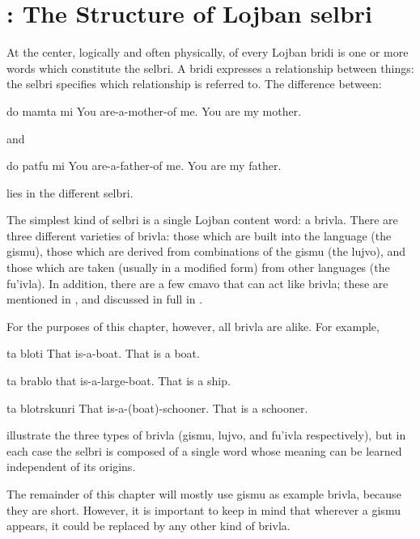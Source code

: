 \chapter{: The Structure of Lojban selbri}
At the center, logically and often physically, of every
    Lojban bridi is one or more words which constitute the selbri.
    A bridi expresses a relationship between things: the selbri
    specifies which relationship is referred to. The difference
    between:
\begin{example}
do mamta mi\n
You are-a-mother-of me.\n
You are my mother.
\end{example}

{\noindent}and
\begin{example}
do patfu mi\n
You are-a-father-of me.\n
You are my father.
\end{example}

{\noindent}lies in the different selbri. 

The simplest kind of selbri is a single Lojban content word:
    a brivla. There are three different varieties of brivla: those
    which are built into the language (the gismu), those which are
    derived from combinations of the gismu (the lujvo), and those
    which are taken (usually in a modified form) from other
    languages (the fu'ivla). In addition, there are a few cmavo
    that can act like brivla; these are mentioned in , and discussed in full in .

For the purposes of this chapter, however, all brivla are
    alike. For example,
\begin{example}
ta bloti\n
That is-a-boat.\n
That is a boat.
\end{example}

\begin{example}
ta brablo\n
that is-a-large-boat.\n
That is a ship.
\end{example}

\begin{example}
ta blotrskunri\n
That is-a-(boat)-schooner.\n
That is a schooner.
\end{example}

{\noindent}illustrate the three types of brivla (gismu, lujvo, and fu'ivla
    respectively), but in each case the selbri is composed of a
    single word whose meaning can be learned independent of its
    origins. 

The remainder of this chapter will mostly use gismu as
    example brivla, because they are short. However, it is
    important to keep in mind that wherever a gismu appears, it
    could be replaced by any other kind of brivla.



